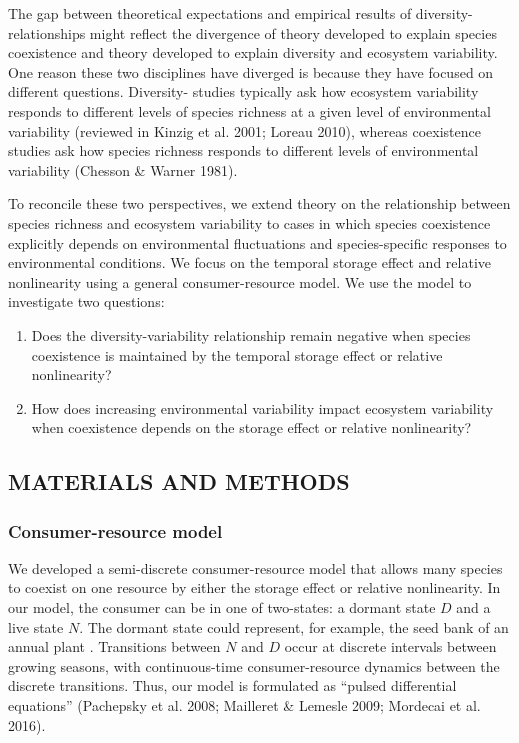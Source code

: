 \documentclass[12pt,]{article}
\begin{document}
The gap between theoretical expectations and empirical results of
diversity- relationships might reflect the
divergence of theory developed to explain species coexistence and theory
developed to explain diversity and ecosystem variability. One reason
these two disciplines have diverged is because they have focused on
different questions. Diversity- studies
typically ask how ecosystem variability responds to different levels of
species richness at a given level of environmental variability (reviewed
in Kinzig et al. 2001; Loreau 2010), whereas coexistence studies ask how
species richness responds to different levels of environmental
variability (Chesson \& Warner 1981).

To reconcile these two perspectives, we extend theory on the
relationship between species richness and ecosystem variability to cases
in which species coexistence explicitly depends on environmental
fluctuations and species-specific responses to environmental conditions.
We focus on the temporal storage effect and relative nonlinearity using
a general consumer-resource model. We use the model to investigate two
questions:

\begin{enumerate}
\def\labelenumi{\arabic{enumi}.}
\item
  Does the diversity-variability relationship remain negative when
  species coexistence is maintained by the temporal storage effect or
  relative nonlinearity?
\item
  How does increasing environmental variability impact ecosystem
  variability when coexistence depends on the storage effect or relative
  nonlinearity?
\end{enumerate}

\subsection{MATERIALS AND METHODS}\label{materials-and-methods}

\subsubsection{Consumer-resource model}\label{consumer-resource-model}

We developed a semi-discrete consumer-resource model that allows many
species to coexist on one resource by either the storage effect or
relative nonlinearity. In our model, the consumer can be in one of
two-states: a dormant state \(D\) and a live state \(N\). The dormant
state could represent, for example, the seed bank of an annual plant
. Transitions between \(N\)
and \(D\) occur at discrete intervals between growing seasons, with
continuous-time consumer-resource dynamics between the discrete
transitions. Thus, our model is formulated as ``pulsed differential
equations'' (Pachepsky et al. 2008; Mailleret \& Lemesle 2009; Mordecai
et al. 2016).
\end{document}
